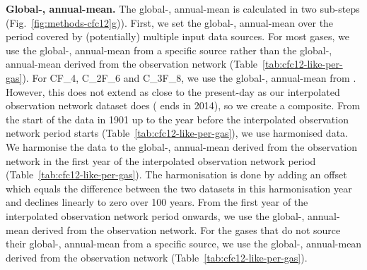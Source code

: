 \textbf{Global-, annual-mean.}
The global-, annual-mean is calculated in two sub-steps (Fig.~\ref{fig:methods-cfc12}g)).
First, we set the global-, annual-mean over the period covered by (potentially) multiple input data sources.
For most gases, we use the global-, annual-mean from a specific source
rather than the global-, annual-mean derived from the observation network
(Table~\ref{tab:cfc12-like-per-gas}).
For CF_4, C_2F_6 and C_3F_8, we use the global-, annual-mean from \citet{trudinger_pfcs_2016}.
However, this does not extend as close to the present-day as our interpolated observation network dataset does
(\citet{trudinger_pfcs_2016} ends in 2014),
so we create a composite.
From the start of the \citet{trudinger_pfcs_2016} data in 1901
up to the year before the interpolated observation network period starts (Table~\ref{tab:cfc12-like-per-gas}),
we use harmonised \citet{trudinger_pfcs_2016} data.
We harmonise the \citet{trudinger_pfcs_2016} data to the global-, annual-mean derived from the observation network
in the first year of the interpolated observation network period (Table~\ref{tab:cfc12-like-per-gas}).
The harmonisation is done by adding an offset
which equals the difference between the two datasets in this harmonisation year
and declines linearly to zero over 100 years.
From the first year of the interpolated observation network period onwards,
we use the global-, annual-mean derived from the observation network.
For the gases that do not source their global-, annual-mean from a specific source,
we use the global-, annual-mean derived from the observation network (Table~\ref{tab:cfc12-like-per-gas}).

